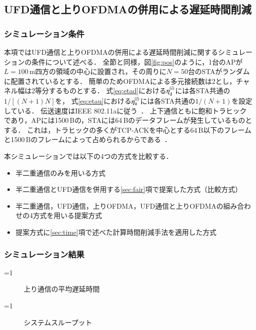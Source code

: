 \documentclass[master]{kuisthesis}		%
\newcounter{flagFig}
\begin{document}
	\subsection{UFD通信と上りOFDMAの併用による遅延時間削減}
		\subsubsection{シミュレーション条件}
			本項ではUFD通信と上りOFDMAの併用による遅延時間削減に関するシミュレーションの条件について述べる．
			全節と同様，図\ref{fig:pos}のように，1台のAPが$L=100$\,m四方の領域の中心に設置され，その周りに$N=50$台のSTAがランダムに配置されているとする．
			簡単のためOFDMAによる多元接続数は2とし，チャネル幅は2等分するものとする．
			式\eqref{eq:etad}における$\eta_{\rm d}^{(i)}$には各STA共通の$1/[(N+1)N]$を，
			式\eqref{eq:etau}における$\eta_{\rm u}^{(l)}$には各STA共通の$1/(N+1)$を設定している．
			伝送速度はIEEE 802.11aに従う~\cite{std}．
			上下通信ともに飽和トラヒックであり，APには1500\,Bの，STAには64\,Bのデータフレームが発生しているものとする．
			これは，トラヒックの多くがTCP-ACKを中心とする64\,B以下のフレームと1500\,Bのフレームによって占められるからである~\cite{traffic}．
			\par
			本シミュレーションでは以下の4つの方式を比較する．
			\begin{itemize}
				\item 半二重通信のみを用いる方式
				\item 半二重通信とUFD通信を併用する\ref{sec:fair}項で提案した方式（比較方式）
				\item 半二重通信，UFD通信，上りOFDMA，UFD通信と上りOFDMAの組み合わせの4方式を用いる提案方式
				\item 提案方式に\ref{sec:time}項で述べた計算時間削減手法を適用した方式
			\end{itemize}

		\subsubsection{シミュレーション結果}
			\ifnum\value{flagFig}=1 {\begin{figure}[t]
				\centering
				\caption{上り通信の平均遅延時間}
				\label{fig:delay}
				\end{figure}}\fi
			\ifnum\value{flagFig}=1 {\begin{figure}[t]
				\centering
				\caption{システムスループット}
				\label{fig:thr}
			\end{figure}}\fi
\end{document}
